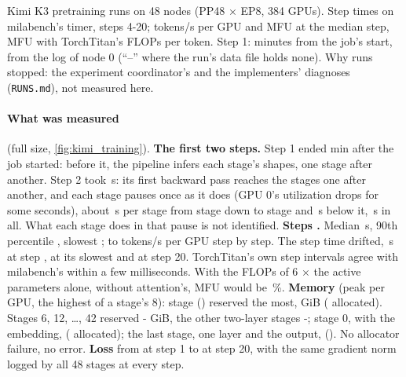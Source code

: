 \begin{table}[h]
  \caption{Kimi K3 pretraining runs on 48 nodes (PP48 $\times$ EP8, 384 GPUs). Step times on milabench's timer, steps 4-20; tokens/s per GPU and MFU at the median step, MFU with TorchTitan's FLOPs per token. Step 1: minutes from the job's start, from the log of node 0 (``--'' where the run's data file holds none). Why runs stopped: the experiment coordinator's and the implementers' diagnoses (\texttt{RUNS.md}), not measured here.}
  \label{tab:kimi_train_runs}
  \centering\scriptsize
  \begin{adjustbox}{max width=\linewidth}
  \end{adjustbox}
\end{table}

\paragraph{What was measured} (full size, \cref{fig:kimi_training}). \textbf{The first two steps.} Step 1 ended \TriKtStepOne{} min after the job started: before it, the pipeline infers each stage's shapes, one stage after another. Step 2 took \TriKtStepTwo\,s: its first backward pass reaches the stages one after another, and each stage pauses once as it does (GPU 0's utilization drops for some seconds), about \TriKtSweepHi\,s per stage from stage \TriKtSweepFirst{} down to stage \TriKtSweepSplit{} and \TriKtSweepLo\,s below it, \TriKtSweepTotal\,s in all. What each stage does in that pause is not identified. \textbf{Steps .} Median \TriKtStep\,s, 90th percentile \TriKtStepPninety, slowest \TriKtStepMax; \TriKtTokLo{} to \TriKtTokHi{} tokens/s per GPU step by step. The step time drifted, \TriKtStepFirst\,s at step \TriKtMeasuredFrom, \TriKtStepMax{} at its slowest and \TriKtStepLast{} at step 20. TorchTitan's own step intervals agree with milabench's within a few milliseconds. With the FLOPs of 6 $\times$ the active parameters alone, without attention's, MFU would be \TriKtMfuSixN\,\%. \textbf{Memory} (peak per GPU, the highest of a stage's 8): stage \TriKtMemWorstStage{} (\texttt{\TriKtMemWorstHost}) reserved the most, \TriKtMemWorst{} GiB (\TriKtMemWorstAlloc{} allocated). Stages 6, 12, \dots, 42 reserved \TriKtMemEdgeLo-\TriKtMemEdgeHi{} GiB, the other two-layer stages \TriKtMemMidLo-\TriKtMemMidHi; stage 0, with the embedding, \TriKtMemZero{} (\TriKtMemZeroAlloc{} allocated); the last stage, one layer and the output, \TriKtMemLast{} (\TriKtMemLastAlloc). No allocator failure, no error. \textbf{Loss} from \TriKtLossFirst{} at step 1 to \TriKtLossLast{} at step 20, with the same gradient norm logged by all 48 stages at every step.

